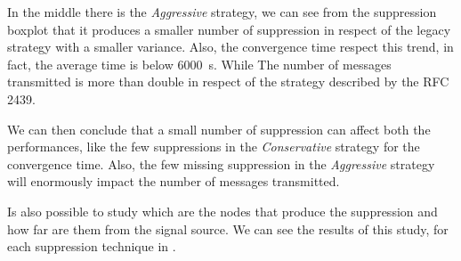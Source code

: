 In the middle there is the \textit{Aggressive} strategy, we can see from the
suppression boxplot that it produces a smaller number of suppression in respect
of the legacy strategy with a smaller variance.
Also, the convergence time respect this trend, in fact, the average time is
below \SI{6000}{\second}.
While The number of messages transmitted is more than double in respect
of the strategy described by the \ac{RFC} \num{2439}.

We can then conclude that a small number of suppression can affect both the
performances, like the few suppressions in the \textit{Conservative} strategy
for the convergence time.
Also, the few missing suppression in the \textit{Aggressive} strategy will
enormously impact the number of messages transmitted.

Is also possible to study which are the nodes that produce the suppression and how
far are them from the signal source.
We can see the results of this study, for each suppression technique in .

